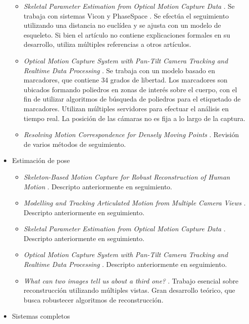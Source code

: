 \begin{itemize}
\begin{itemize}
		\item \emph{Skeletal Parameter Estimation from Optical Motion Capture Data} \cite{kirk2005skeletal}. 
		Se trabaja con sistemas Vicon \cite{vicon} y PhaseSpace \cite{phasespace}. Se efectúa el seguimiento utilizando una distancia no euclídea y se ajusta con un modelo de esqueleto. Si bien el artículo no contiene explicaciones formales en su desarrollo, utiliza múltiples referencias a otros artículos.
		\item \emph{Optical Motion Capture System with Pan-Tilt Camera Tracking and  Realtime Data Processing} \cite{kurihara2002optical}.
		Se trabaja con un modelo basado en marcadores, que contiene 34 grados de libertad. Los marcadores son ubicados formando poliedros en  zonas de interés sobre el cuerpo, con el fin de utilizar algoritmos de búsqueda de poliedros para el etiquetado de marcadores. Utilizan múltiples servidores para efectuar el análisis en tiempo real. La posición de las cámaras no es fija a lo largo de la captura.
		\item \emph{Resolving Motion Correspondence for Densely Moving Points} \cite{survey_tracking}. Revisión de varios métodos de seguimiento.
	\end{itemize}
	\item Estimación de pose
	\begin{itemize}
		\item \emph{Skeleton-Based Motion Capture for Robust Reconstruction of Human Motion} \cite{herda}. 
		Descripto anteriormente en seguimiento.
		\item \emph{Modelling and Tracking Articulated Motion from Multiple Camera Views} \cite{ringer2000modelling}.
		Descripto anteriormente en seguimiento.      
		\item \emph{Skeletal Parameter Estimation from Optical Motion Capture Data} \cite{kirk2005skeletal}.
		Descripto anteriormente en seguimiento.
		\item \emph{Optical Motion Capture System with Pan-Tilt Camera Tracking and  Realtime Data Processing} \cite{kurihara2002optical}.	Descripto anteriormente en seguimiento.	 
		\item \emph{What can two images tell us about a third one?} \cite{faugueras}. Trabajo esencial sobre reconstrucción utilizando múltiples vistas. Gran desarrollo teórico, que busca robustecer algoritmos de reconstrucción.
	\end{itemize}
	\item Sistemas completos
	\begin{itemize}

\end{itemize}
\end{itemize}
